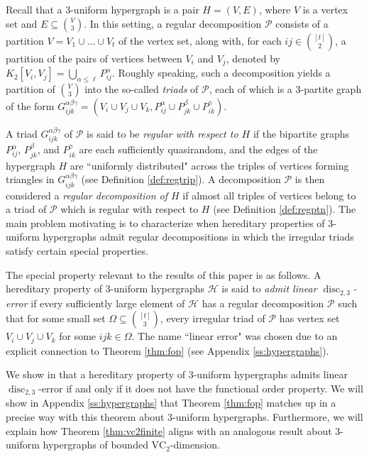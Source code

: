 \documentclass[12pt,oneside,british,a4wide]{amsart}
\numberwithin{equation}{section}
\theoremstyle{definition}
\def\VC{\mathrm{VC}}
\newcommand{\calH}{\mathcal{H}}
\newcommand{\calP}{\mathcal{P}}
\def\disc{\operatorname{disc}}
\begin{document}
Recall that a $3$-uniform hypergraph is a pair $H=(V,E)$, where $V$ is a vertex set and $E\subseteq{V\choose 3}$.  In this setting, a regular decomposition $\calP$ consists of a partition $V=V_1\cup \ldots \cup V_t$ of the vertex set, along with, for each $ij\in {[t]\choose 2}$, a partition of the pairs of vertices between $V_i$ and $V_j$, denoted by $K_2[V_i, V_j]=\bigcup_{\alpha\leq \ell}P_{ij}^{\alpha}$. Roughly speaking, such a decomposition yields a partition of ${V\choose 3}$ into the so-called \emph{triads} of $\calP$, each of which is a $3$-partite graph of the form $G_{ijk}^{\alpha\beta\gamma}=(V_i\cup V_j\cup V_k, P_{ij}^{\alpha}\cup P_{jk}^{\beta}\cup P_{ik}^{\gamma})$.  

A triad $G_{ijk}^{\alpha\beta\gamma}$ of $\calP$ is said to be \emph{regular with respect to $H$} if the bipartite graphs $P_{ij}^{\alpha}$, $P_{jk}^{\beta}$, and $P_{ik}^{\gamma}$ are each sufficiently quasirandom, and the edges of the hypergraph $H$ are ``uniformly distributed" across the triples of vertices forming  triangles in $G_{ijk}^{\alpha\beta\gamma}$ (see Definition \ref{def:regtrip}). A decomposition $\calP$ is then considered a \emph{regular decomposition of $H$} if almost all triples of vertices belong to a triad of $\calP$ which is regular with respect to $H$ (see Definition \ref{def:regptn}).  The main problem motivating \cite{Terry.2021b} is to characterize when hereditary properties of $3$-uniform hypergraphs admit regular decompositions in which the irregular  triads satisfy certain special properties.

The special property relevant to the results of this paper is as follows.  A hereditary property of $3$-uniform hypergraphs $\calH$ is said to \emph{admit linear $\disc_{2,3}$-error} \cite[Definition 2.11(3)]{Terry.2021b} if every sufficiently large element of $\calH$ has a regular decomposition $\calP$ such that for some small set $\Omega\subseteq {[t]\choose 3}$, every irregular triad of $\calP$ has vertex set $V_i\cup V_j\cup V_k$ for some $ijk\in \Omega$.   The name ``linear error" was chosen due to an explicit connection to Theorem \ref{thm:fop} (see Appendix \ref{ss:hypergraphs}).

We show in \cite[Theorem 1.7]{Terry.2021b} that a hereditary property of $3$-uniform hypergraphs admits linear $\disc_{2,3}$-error if and only if it does not have the functional order property.  We will show in Appendix \ref{ss:hypergraphs} that Theorem \ref{thm:fop}  matches up in a precise way with this theorem about 3-uniform hypergraphs.  Furthermore, we will explain how Theorem \ref{thm:vc2finite} aligns with an analogous result about $3$-uniform hypergraphs of bounded $\VC_2$-dimension. 
\end{document}
